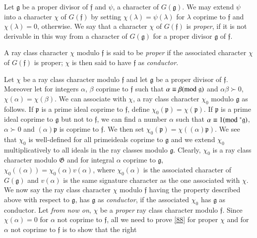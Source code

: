 Let $\mathfrak{g}$ be a proper divisor of $\mathfrak{f}$ and $\psi$, a
character of $G(\mathfrak{g})$. We may extend $\psi$ into a character
$\chi$ of $G(\mathfrak{f})$ by setting $\chi(\lambda)=\psi(\lambda)$
for $\lambda$ coprime to $\mathfrak{f}$ and $\chi(\lambda)=0$,
otherwise. We say that a character $\chi$ of $G(\mathfrak{f})$ is {\em
  proper}, if it is not derivable in this way from a character of
$G(\mathfrak{g})$ for a proper divisor $\mathfrak{g}$ of
$\mathfrak{f}$.

A ray class character $\chi$ modulo $\mathfrak{f}$ is said to be {\em
  proper} if the associated character $\chi$ of $G(\mathfrak{f})$ is
proper; $\chi$ is then said to have $\mathfrak{f}$ as {\em conductor}.

Let $\chi$ be a ray class character modulo $\mathfrak{f}$ and let
$\mathfrak{g}$ be a proper divisor of $\mathfrak{f}$. Moreover let for
integers $\alpha$, $\beta$ coprime to $\mathfrak{f}$ such that
$\alpha\equiv \beta(\rm{mod} \;\mathfrak{g})$ and $\alpha\beta \succ 0$,
$\chi(\alpha)=\chi(\beta)$. We can associate with $\chi$, a ray class
character $\chi_{0}$ modulo $\mathfrak{g}$ as follows. If
$\mathfrak{p}$ is a prime ideal coprime to $\mathfrak{f}$, define
$\chi_{0}(\mathfrak{p})=\chi(\mathfrak{p})$. If $\mathfrak{p}$ is a
prime ideal coprime to $\mathfrak{g}$ but not to $\mathfrak{f}$, we
can find a number $\alpha$ such that $\alpha\equiv
1(\rm{mod} \;^{\ast}\mathfrak{g})$, $\alpha \succ 0$ and $(\alpha)\mathfrak{p}$ is
coprime to $\mathfrak{f}$. We then set
$\chi_{0}(\mathfrak{p})=\chi((\alpha)\mathfrak{p})$. We see that
$\chi_{0}$ is well-defined for all prime\pageoriginale ideals coprime
to $\mathfrak{g}$ and we extend $\chi_{0}$ multiplicatively to all
ideals in the ray classes modulo $\mathfrak{g}$. Clearly, $\chi_{0}$
is a ray class character modulo $\mathfrak{G}$ and for integral
$\alpha$ coprime to $\mathfrak{g}$,
$\chi_{0}((\alpha))=\chi_{0}(\alpha)v(\alpha)$, where
$\chi_{0}(\alpha)$ is the associated character of $G(\mathfrak{g})$
and $v(\alpha)$ is the same signature character as the one associated
with $\chi$. We now say the ray class character $\chi$ modulo
$\mathfrak{f}$ having the property described above with respect to
$\mathfrak{g}$, has $\mathfrak{g}$ as {\em conductor}, if the
associated $\chi_{0}$ has $\mathfrak{g}$ as conductor. Let {\em from
  now on}, $\chi$ be a {\em proper} ray class character modulo
$\mathfrak{f}$. Since $\chi(\alpha)=0$ for $\alpha$ not coprime to
$\mathfrak{f}$, all we need to prove \eqref{88} for proper $\chi$ and
for $\alpha$ not coprime to $\mathfrak{f}$ is to show that the right
